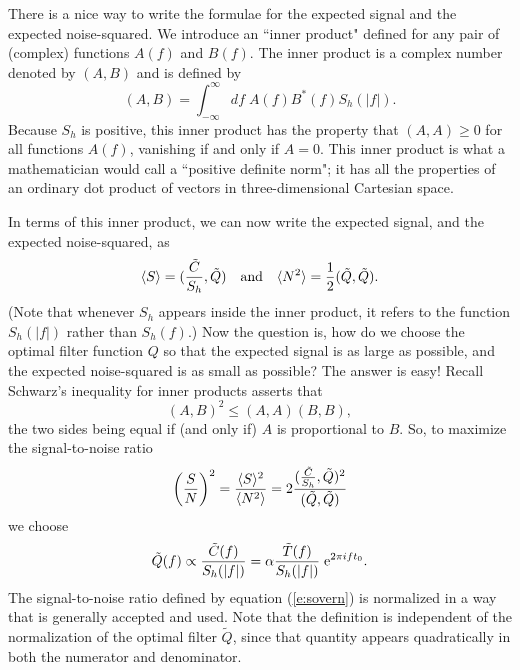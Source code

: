 There is a nice way to write the formulae for the expected signal and
the expected noise-squared.  We introduce an ``inner product" defined
for any pair of (complex) functions $A(f)$ and $B(f)$.  The inner
product is a complex number denoted by $(A,B)$ and is defined by
\begin{equation}
\label{e:definprod}
(A,B) = \int_{-\infty}^\infty df \; {A(f) B^*(f) S_h(|f|)}.
\end{equation}
Because $S_h$ is positive, this inner product has the property that $(A,A)
\ge 0$ for all functions $A(f)$, vanishing if and only if $A=0$.  This
inner product is what a mathematician would call a ``positive definite
norm"; it has all the properties of an ordinary dot product of vectors
in three-dimensional Cartesian space.

In terms of this inner product, we can now write the expected signal, and the expected
noise-squared, as
\begin{equation}
\langle S \rangle = ({\tilde C \over S_h},\tilde Q)
\quad {\rm and} \quad \langle N^2 \rangle = {1 \over 2} (\tilde Q, \tilde Q).
\end{equation}
(Note that whenever $S_h$ appears inside the inner product, it refers
to the function $S_h(|f|)$ rather than $S_h(f)$.) Now the question is,
how do we choose the optimal filter function $Q$ so that the expected
signal is as large as possible, and the expected noise-squared is as
small as possible?  The answer is easy! Recall Schwarz's inequality for
inner products asserts that
\begin{equation}
        (A,B)^2 \le (A,A)(B,B),
\end{equation}
the two sides being equal if (and only if) $A$ is proportional to $B$.
So, to maximize the signal-to-noise ratio 
\begin{equation}
\label{e:sovern}
\left( {S \over N} \right)^2 ={\langle S \rangle^2 \over \langle N^2
\rangle} = 2 { ({\tilde C \over S_h},\tilde Q)^2 \over (\tilde Q,
\tilde Q)}
\end{equation}
we choose
\begin{equation}
\tilde Q(f) \propto {\tilde C(f) \over S_h(|f|)} = 
\alpha {\tilde T(f) \over S_h(|f|)} \; {\rm e}^{2 \pi i f t_0}.
\end{equation}
The signal-to-noise ratio defined by equation (\ref{e:sovern}) is normalized
in a way that is generally accepted and used.  Note that the definition is
independent of the normalization of the optimal filter $\tilde Q$, since
that quantity appears quadratically in both the numerator and denominator.
